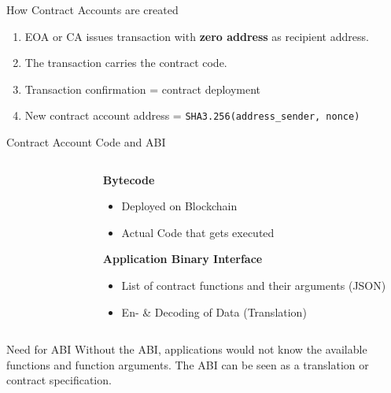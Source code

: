 \documentclass[handout]{beamer}
\begin{document}
\begin{frame}{How Contract Accounts are created}

\begin{enumerate}
				\item<1-> EOA or CA issues transaction with \textbf{zero address} as recipient address.
				\vspace{1em}
				\item<2-> The transaction carries the contract code.
				\item<3-> Transaction confirmation = contract deployment
				\item<4-> New contract account address = \texttt{SHA3.256(address\_sender, nonce)} %
\end{enumerate}
			
\end{frame}


\begin{frame}{Contract Account Code and ABI}
	\begin{columns}[T]
		\begin{column}{0.6\textwidth}
			\begin{figure}[h!]
				\center
					
			\end{figure}\vspace{1em}
		\end{column}
		\begin{column}{0.5\textwidth}
			\textbf{Bytecode}
				\begin{itemize}
					\item Deployed on Blockchain
					\item Actual Code that gets executed
				\end{itemize}
		\vspace{2em}
			\textbf{Application Binary Interface}
				\begin{itemize}
					\item List of contract functions and their arguments (JSON)
					\item En- \& Decoding of Data (Translation) 
				\end{itemize}
		\end{column}
	\end{columns}
\vspace{1em}
	\begin{keytakeaway}{Need for ABI}
		 Without the ABI, applications would not know the available functions and function arguments. The ABI can be seen as a translation or contract specification.
	\end{keytakeaway}		
\end{frame}
\end{document}
